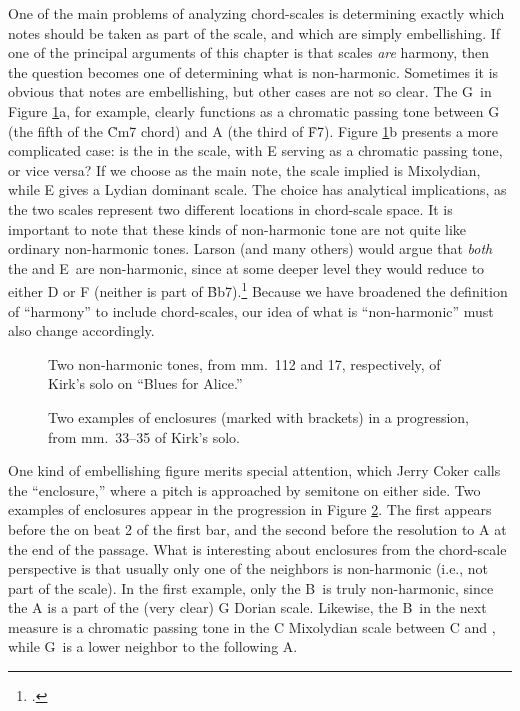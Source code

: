 One of the main problems of analyzing chord-scales is determining exactly
which notes should be taken as part of the scale, and which are simply
embellishing. If one of the principal arguments of this chapter is that scales
\emph{are} harmony, then the question becomes one of determining what is
non-harmonic. Sometimes it is obvious that notes are embellishing, but other
cases are not so clear. The G\sharp\ in Figure \ref{csa:non-harmonic-tones}a,
for example, clearly functions as a chromatic passing tone between G (the
fifth of the \h{Cm7} chord) and A (the third of \h{F7}). Figure
\ref{csa:non-harmonic-tones}b presents a more complicated case: is the \Eflat
in the scale, with E\nat{} serving as a chromatic passing tone, or vice versa?
If we choose \Eflat as the main note, the scale implied is \Bflat Mixolydian,
while E\nat{} gives a \Bflat Lydian dominant scale. The choice has analytical
implications, as the two scales represent two different locations in
chord-scale space. It is important to note that these kinds of non-harmonic
tone are not quite like ordinary non-harmonic tones. Larson (and many others)
would argue that \emph{both} the \Eflat and E\nat\ are non-harmonic, since at
some deeper level they would reduce to either D or F (neither is part of
\h{Bb7}).\footcite[5--10]{larson:2009} Because we have broadened the
definition of ``harmony'' to include chord-scales, our idea of what is
``non-harmonic'' must also change accordingly.

\begin{figure}[tbp]
  \caption[Two non-harmonic tones in Kirk's solo.]{Two non-harmonic tones, from
    mm.~112 and 17, respectively, of Kirk's solo on ``Blues for Alice.''}
  \label{csa:non-harmonic-tones}
\end{figure}

\begin{figure}[tbp]
  \caption[Two examples of enclosures in a \tfo progression.]{Two examples of
    enclosures (marked with brackets) in a \tfo progression, from mm.~33--35
    of Kirk's solo.}
  \label{csa:enclosures}
\end{figure}

One kind of embellishing figure merits special attention, which Jerry Coker
calls the ``enclosure,'' where a pitch is approached by semitone on either
side. Two examples of enclosures appear in the \tfo progression in
Figure \ref{csa:enclosures}. The first appears before the \Bflat on beat 2 of
the first bar, and the second before the resolution to A at the end of the
passage. What is interesting about enclosures from the chord-scale perspective
is that usually only one of the neighbors is non-harmonic (i.e., not part of
the scale). In the first example, only the B\nat\ is truly non-harmonic, since
the A is a part of the (very clear) G Dorian scale. Likewise, the B\nat\ in
the next measure is a chromatic passing tone in the C Mixolydian scale between
C and \Bflat, while G\sharp\ is a lower neighbor to the following A.

